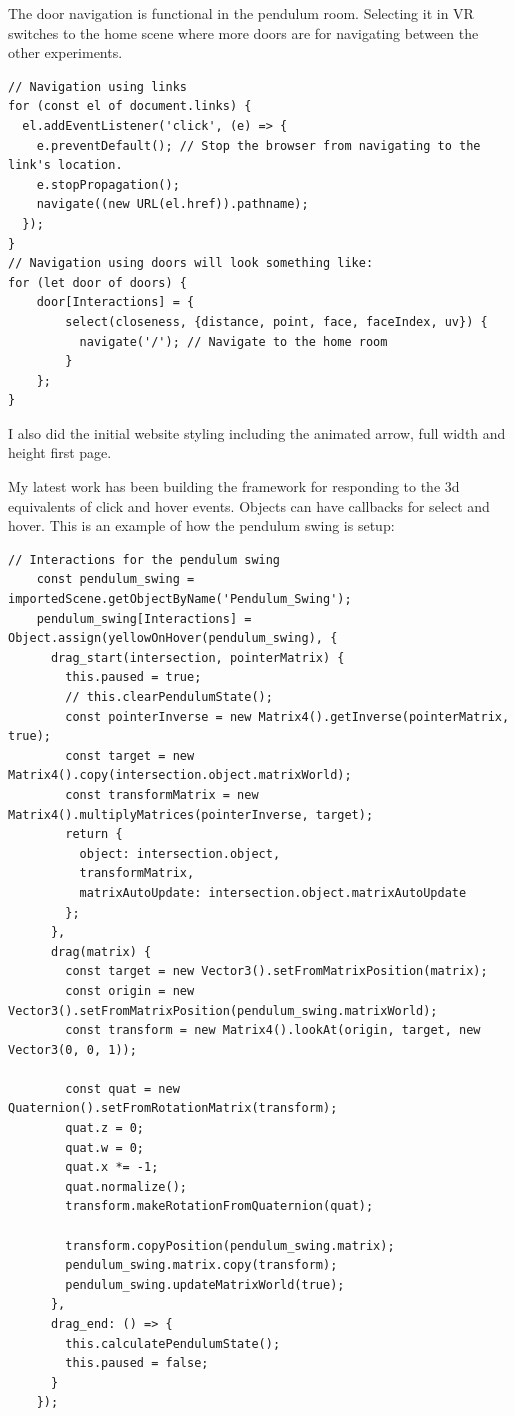 \documentclass[onecolumn, draftclsnofoot,10pt, compsoc]{IEEEtran}
\begin{document}
The door navigation is functional in the pendulum room.  Selecting it in VR switches to the home scene where more doors are for navigating between the other experiments.

\begin{lstlisting}
// Navigation using links
for (const el of document.links) {
  el.addEventListener('click', (e) => {
    e.preventDefault(); // Stop the browser from navigating to the link's location.
    e.stopPropagation();
    navigate((new URL(el.href)).pathname);
  });
}
// Navigation using doors will look something like:
for (let door of doors) {
    door[Interactions] = {
        select(closeness, {distance, point, face, faceIndex, uv}) {
          navigate('/'); // Navigate to the home room
        }
    };
}
\end{lstlisting}

I also did the initial website styling including the animated arrow, full width and height first page.

My latest work has been building the framework for responding to the 3d equivalents of click and hover events.  Objects can have callbacks for select and hover.  This is an example of how the pendulum swing is setup:

\begin{lstlisting}
// Interactions for the pendulum swing
    const pendulum_swing = importedScene.getObjectByName('Pendulum_Swing');
    pendulum_swing[Interactions] = Object.assign(yellowOnHover(pendulum_swing), {
      drag_start(intersection, pointerMatrix) {
        this.paused = true;
        // this.clearPendulumState();
        const pointerInverse = new Matrix4().getInverse(pointerMatrix, true);
        const target = new Matrix4().copy(intersection.object.matrixWorld);
        const transformMatrix = new Matrix4().multiplyMatrices(pointerInverse, target);
        return {
          object: intersection.object,
          transformMatrix,
          matrixAutoUpdate: intersection.object.matrixAutoUpdate
        };
      },
      drag(matrix) {
        const target = new Vector3().setFromMatrixPosition(matrix);
        const origin = new Vector3().setFromMatrixPosition(pendulum_swing.matrixWorld);
        const transform = new Matrix4().lookAt(origin, target, new Vector3(0, 0, 1));

        const quat = new Quaternion().setFromRotationMatrix(transform);
        quat.z = 0;
        quat.w = 0;
        quat.x *= -1;
        quat.normalize();
        transform.makeRotationFromQuaternion(quat);

        transform.copyPosition(pendulum_swing.matrix);
        pendulum_swing.matrix.copy(transform);
        pendulum_swing.updateMatrixWorld(true);
      },
      drag_end: () => {
        this.calculatePendulumState();
        this.paused = false;
      }
    });
\end{lstlisting}
\end{document}

